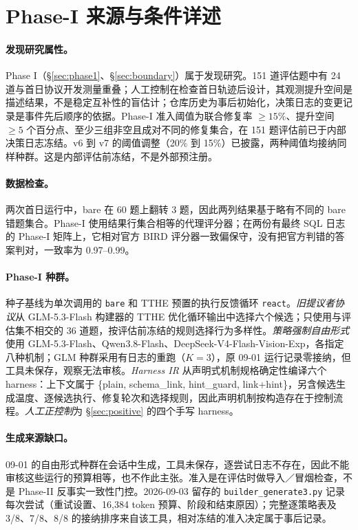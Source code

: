 \section{Phase-I 来源与条件详述}\label{app:phase1-provenance}
\paragraph{发现研究属性。}Phase I（\S\ref{sec:phase1}、\S\ref{sec:boundary}）属于发现研究。151 道评估题中有 24 道与首日协议开发测量重叠；人工控制在检查首日轨迹后设计，其观测提升空间是描述结果，不是稳定互补性的盲估计；仓库历史为事后初始化，决策日志的变更记录是事件先后顺序的依据。Phase-I 准入阈值为联合修复率 $\geq15\%$、提升空间 $\geq5$ 个百分点、至少三组非空且成对不同的修复集合，在 151 题评估前已于内部决策日志冻结。v6 到 v7 的阈值调整（20\% 到 15\%）已披露，两种阈值均接纳同样种群。这是内部评估前冻结，不是外部预注册。
\paragraph{数据检查。}两次首日运行中，bare 在 60 题上翻转 3 题，因此两列结果基于略有不同的 bare 错题集合。Phase-I 使用结果行集合相等的代理评分器；在两份有最终 SQL 日志的 Phase-I 矩阵上，它相对官方 BIRD 评分器一致偏保守，没有把官方判错的答案判对，一致率为 0.97--0.99。
\paragraph{Phase-I 种群。}种子基线为单次调用的 \texttt{bare} 和 TTHE 预置的执行反馈循环 \texttt{react}。\emph{旧提议者协议}从 GLM-5.3-Flash 构建器的 TTHE 优化循环输出中选择六个候选；只使用与评估集不相交的 36 道题，按评估前冻结的规则选择行为多样性。\emph{策略强制自由形式}使用 GLM-5.3-Flash、Qwen3.8-Flash、DeepSeek-V4-Flash-Vision-Exp，各指定八种机制；GLM 种群采用有日志的重跑（$K=3$），原 09-01 运行记录零接纳，但工具未保存，观察无法审核。\emph{Harness IR} 从声明式机制规格确定性编译六个 harness：上下文属于 \{plain, schema\_link, hint\_guard, link+hint\}，另含候选生成温度、逐候选执行、修复轮次和选择规则，因此声明机制按构造存在于控制流程。\emph{人工正控制}为 \S\ref{sec:positive} 的四个手写 harness。
\paragraph{生成来源缺口。}09-01 的自由形式种群在会话中生成，工具未保存，逐尝试日志不存在，因此不能审核这些运行的预算相等，也不作此主张。准入是在评估时做导入／冒烟检查，不是 Phase-II 反事实一致性门控。2026-09-03 留存的 \texttt{builder\_generate3.py} 记录每次尝试（重试设置、16,384 token 预算、阶段和结束原因）；完整逐策略表及 3/8、7/8、8/8 的接纳排序来自该工具，相对冻结的准入决定属于事后记录。

